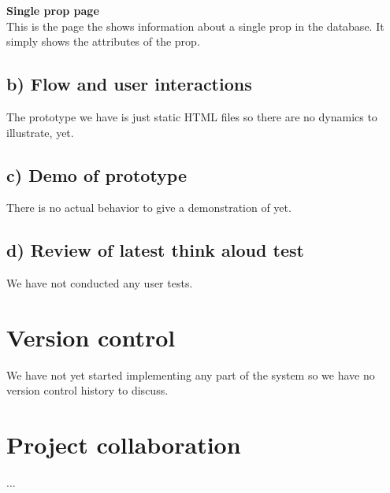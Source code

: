 \documentclass[12pt]{article}
\begin{document}
\newline
\textbf{Single prop page}\\
This is the page the shows information about a single prop in the database. It simply shows the attributes of the prop.
\subsection{b) Flow and user interactions}
The prototype we have is just static HTML files so there are no dynamics to illustrate, yet.
\subsection{c) Demo of prototype}
There is no actual behavior to give a demonstration of yet.
\subsection{d) Review of latest think aloud test}
We have not conducted any user tests.
\section{Version control}
We have not yet started implementing any part of the system so we have no version control history to discuss.
\section{Project collaboration}
...
\end{document}
